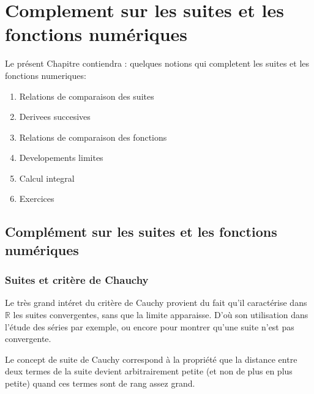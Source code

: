\documentclass[letterpaper,10pt,french]{jupyterBook}
\begin{document}
\chapter{Complement sur les suites et les fonctions numériques}
\label{\detokenize{complement:complement-sur-les-suites-et-les-fonctions-numeriques}}\label{\detokenize{complement::doc}}
\sphinxAtStartPar
Le présent Chapitre contiendra : quelques notions qui completent les suites et les fonctions numeriques:
\begin{enumerate}
%
\item {} 
\sphinxAtStartPar
Relations de comparaison des suites

\item {} 
\sphinxAtStartPar
Derivees succesives

\item {} 
\sphinxAtStartPar
Relations de comparaison des fonctions

\item {} 
\sphinxAtStartPar
Developements limites

\item {} 
\sphinxAtStartPar
Calcul integral

\item {} 
\sphinxAtStartPar
Exercices

\end{enumerate}


\section{Complément sur les suites et les fonctions numériques}
\label{\detokenize{complements:complement-sur-les-suites-et-les-fonctions-numeriques}}\label{\detokenize{complements::doc}}

\subsection{Suites et critère de Chauchy}
\label{\detokenize{complements:suites-et-critere-de-chauchy}}
\sphinxAtStartPar
Le très grand intéret du critère de Cauchy provient du fait qu’il caractérise dans \(\mathbb{R}\) les suites convergentes, sans que la limite apparaisse. D’où son utilisation dans l’étude des séries par exemple, ou encore pour montrer qu’une suite n’est pas convergente.

\sphinxAtStartPar
Le concept de suite de Cauchy correspond à la propriété que la distance entre deux termes de la suite devient arbitrairement petite (et non de plus en plus petite) quand ces termes sont de rang assez grand.
\end{document}
